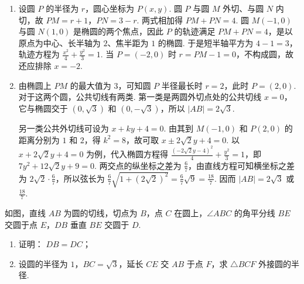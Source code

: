 \begin{solution}
\begin{enumerate}
\item 设圆 \(P\) 的半径为 \(r\)，圆心坐标为 \(P(x,y)\). 圆 \(P\) 与圆 \(M\) 外切、与圆 \(N\) 内切，故
\(\displaystyle PM=r+1\)，\(PN=3-r\). 两式相加得 \(PM+PN=4\). 圆 \(M(-1,0)\) 与圆 \(N(1,0)\) 是椭圆的两个焦点，因此 \(P\) 的轨迹满足 \(\displaystyle PM+PN=4\)，是以原点为中心、长半轴为 \(2\)、焦半距为 \(1\) 的椭圆. 于是短半轴平方为 \(4-1=3\)，轨迹方程为
\(\displaystyle\frac{x^2}{4}+\frac{y^2}{3}=1\). 当 \(P=(-2,0)\) 时 \(r=PM-1=0\)，不构成圆，故还应排除 \(x=-2\).
\item 由椭圆上 \(PM\) 的最大值为 \(3\)，可知圆 \(P\) 半径最长时 \(r=2\)，此时 \(P=(2,0)\). 对于这两个圆，公共切线有两类. 第一类是两圆外切点处的公共切线 \(x=0\)，它与椭圆交于 \((0,\sqrt3)\) 和 \((0,-\sqrt3)\)，所以 \(|AB|=2\sqrt3\).

另一类公共外切线可设为 \(x+ky+4=0\). 由其到 \(M(-1,0)\) 和 \(P(2,0)\) 的距离分别为 \(1\) 和 \(2\)，得 \(k^2=8\)，故可取 \(x\pm2\sqrt2y+4=0\). 以 \(x+2\sqrt2y+4=0\) 为例，代入椭圆方程得
\(\displaystyle\frac{(-2\sqrt2y-4)^2}{4}+\frac{y^2}{3}=1\)，即 \(7y^2+12\sqrt2y+9=0\). 两交点的纵坐标之差为 \(\frac{6}{7}\)，由直线方程可知横坐标之差为 \(2\sqrt2\cdot\frac{6}{7}\)，所以弦长为
\(\displaystyle\frac{6}{7}\sqrt{1+\left(2\sqrt2\right)^2}=\frac{6}{7}\sqrt9=\frac{18}{7}\). 因而 \(|AB|=2\sqrt3\) 或 \(\frac{18}{7}\).
\end{enumerate}
\end{solution}

\begin{problem}
如图，直线 \(AB\) 为圆的切线，切点为 \(B\)，点 \(C\) 在圆上，\(\angle ABC\) 的角平分线 \(BE\) 交圆于点 \(E\)，\(DB\) 垂直 \(BE\) 交圆于 \(D\).

\begin{enumerate}
\item 证明： \(DB = DC\)；
\item 设圆的半径为 \(1\)，\(BC = \sqrt{3}\)，延长 \(CE\) 交 \(AB\) 于点 \(F\)，求 \(\triangle BCF\) 外接圆的半径.
\end{enumerate}

\end{problem}

